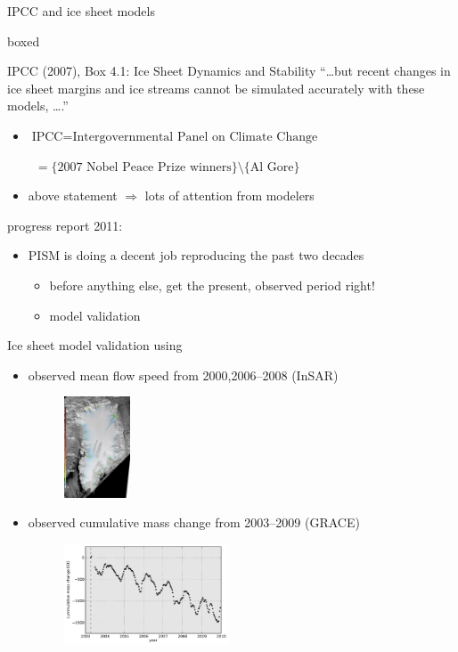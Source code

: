 \documentclass[intlimits]{beamer}
\begin{document}
\begin{frame}{IPCC and ice sheet models}
  \begin{beamercolorbox}[rounded=true,shadow=true]{boxed}
    \begin{block}{IPCC (2007), Box 4.1: Ice Sheet Dynamics and Stability}
      ``\ldots but recent changes in ice sheet margins and ice streams cannot be simulated accurately with these models, \ldots.''
    \end{block}
  \end{beamercolorbox}
  \begin{itemize}
  \item $\text{IPCC} = \text{Intergovernmental Panel on Climate Change}$

\qquad \, $=\{\text{2007 Nobel Peace Prize winners}\} \setminus \{\text{Al Gore}\}$
  \item above statement $\Longrightarrow$ lots of attention from modelers
  \end{itemize}

  \begin{block}{progress report 2011:}

    \begin{itemize}
    \item PISM is doing a decent job reproducing the past two decades
      \begin{itemize}
      \item before anything else, get the present, observed period right!
      \item \alert{model validation}
      \end{itemize}
    \end{itemize}
  \end{block}
\end{frame}


\begin{frame}{Ice sheet model validation using}
 \begin{itemize}
  \item observed mean flow speed from 2000,2006--2008 (InSAR)
    \begin{figure}
      \includegraphics[height=3cm]{modis-insar}
    \end{figure}
  \item observed cumulative mass change from 2003--2009 (GRACE)
    \begin{figure}
      \includegraphics[height=3cm]{ts_grn_grace_2003-2010} 
    \end{figure}
  \end{itemize}
\end{frame}
\end{document}
